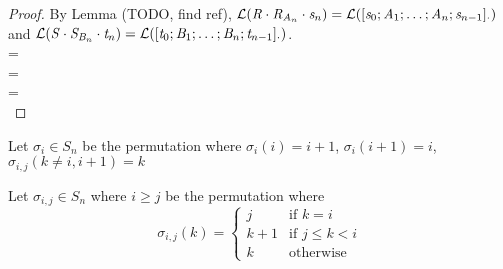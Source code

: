 \begin{lemma}
\begin{proof}
By Lemma (TODO, find ref),
$\mathcal{L}(\mathit{R}\cdot\mathit{R}_{\mathit{A}_n}\cdot\mathit{s}_n)=
\mathcal{L}([\mathit{s}_0 ; \mathit{A}_1 ; \ldots ;
\mathit{A}_n ; \mathit{s}_{n-1}]_{\cdot})$ and
$\mathcal{L}(\mathit{S}\cdot\mathit{S}_{\mathit{B}_n}\cdot\mathit{t}_n)=
\mathcal{L}([\mathit{t}_0 ; \mathit{B}_1 ; \ldots ;
\mathit{B}_n ; \mathit{t}_{n-1}]_{\cdot})$.\\
=\\
=\\
=\\
\end{proof}
\end{lemma}

\begin{definition}
Let $\sigma_{i} \in S_n$ be the permutation where
$\sigma_{i}(i) = i+1$, $\sigma_{i}(i+1) = i$, $\sigma_{i,j}(k\neq i,i+1) = k$
\end{definition}

\begin{definition}
Let $\sigma_{i,j} \in S_n$ where $i\geq j$ be the permutation where
\[
  \sigma_{i,j}(k)=
    \begin{cases}
      j& \text{if } k=i\\
      k+1& \text{if } j\leq k<i\\
      k& \text{otherwise}
    \end{cases}
\]
\end{definition}

